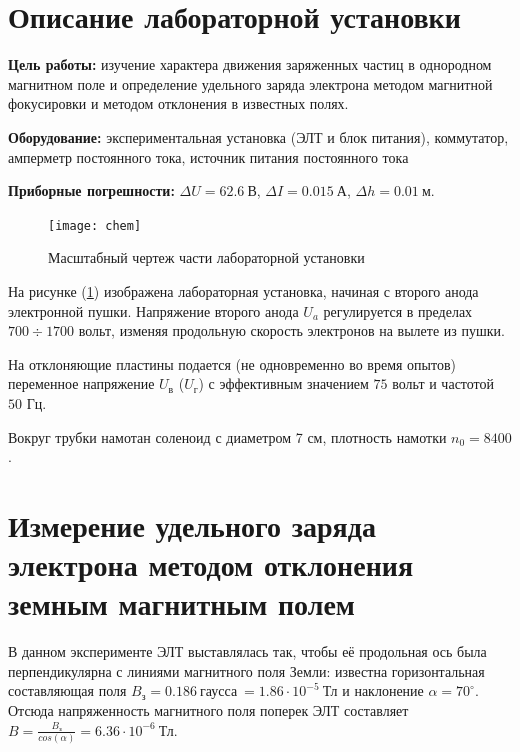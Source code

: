 \tableofcontents

% 
\newpage
\section{Описание лабораторной установки}

\textbf{Цель работы:} изучение характера движения заряженных частиц в однородном магнитном поле и определение удельного заряда электрона методом магнитной фокусировки и методом отклонения в известных полях.

\textbf{Оборудование:}
экспериментальная установка (ЭЛТ и блок питания), коммутатор, амперметр постоянного тока, источник питания постоянного тока 

\textbf{Приборные погрешности:} $\Delta{U}=62.6\ \text{В}$, $\Delta{I}=0.015\ \text{А}$, $\Delta{h}=0.01\ \text{м}$. 

\begin{figure}[ht!]
	\centering
	\texttt{[image: chem]}
	\caption{Масштабный чертеж части лабораторной установки}
	\label{fig:cxem}
\end{figure}

На рисунке (\ref{fig:cxem}) изображена лабораторная установка, начиная с второго анода электронной пушки. Напряжение второго анода $U_a$ регулируется в пределах $700\div1700$ вольт, изменяя продольную скорость электронов на вылете из пушки.

На отклоняющие пластины подается (не одновременно во время опытов) переменное напряжение $U_\text{в}$ ($U_\text{г}$) с эффективным значением $75$ вольт и частотой $50$ Гц. 

Вокруг трубки намотан соленоид с диаметром 7 см, плотность намотки $n_0=8400$.



\section{Измерение удельного заряда электрона методом отклонения земным магнитным полем}

В данном эксперименте ЭЛТ выставлялась так, чтобы её продольная ось была перпендикулярна с линиями магнитного поля Земли: известна горизонтальная составляющая поля  $B_\text{з}=0.186\ \text{гаусса}\ =1.86\cdot10^{-5}\ \text{Тл}$ и наклонение $\alpha=70^{\circ}$. Отсюда напряженность магнитного поля поперек ЭЛТ составляет $B=\frac{B_\text{з}}{cos(\alpha)}=6.36\cdot10^{-6}\ \text{Тл}$.

